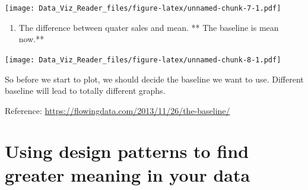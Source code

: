 \documentclass[]{book}
\newenvironment{Shaded}{\begin{snugshade}}{\end{snugshade}}
\newcommand{\KeywordTok}[1]{\textcolor[rgb]{0.13,0.29,0.53}{\textbf{#1}}}
\newcommand{\DataTypeTok}[1]{\textcolor[rgb]{0.13,0.29,0.53}{#1}}
\newcommand{\DecValTok}[1]{\textcolor[rgb]{0.00,0.00,0.81}{#1}}
\newcommand{\StringTok}[1]{\textcolor[rgb]{0.31,0.60,0.02}{#1}}
\newcommand{\CommentTok}[1]{\textcolor[rgb]{0.56,0.35,0.01}{\textit{#1}}}
\newcommand{\OtherTok}[1]{\textcolor[rgb]{0.56,0.35,0.01}{#1}}
\newcommand{\ControlFlowTok}[1]{\textcolor[rgb]{0.13,0.29,0.53}{\textbf{#1}}}
\newcommand{\OperatorTok}[1]{\textcolor[rgb]{0.81,0.36,0.00}{\textbf{#1}}}
\newcommand{\NormalTok}[1]{#1}
\providecommand{\tightlist}{%
  \setlength{\itemsep}{0pt}\setlength{\parskip}{0pt}}
\theoremstyle{definition}
\theoremstyle{definition}
\theoremstyle{definition}
\theoremstyle{remark}
\begin{document}
\texttt{[image: Data\_Viz\_Reader\_files/figure-latex/unnamed-chunk-7-1.pdf]}

\begin{enumerate}
\def\labelenumi{\arabic{enumi}.}
\setcounter{enumi}{4}
\tightlist
\item
  The difference between quater sales and mean. ** The baseline is mean
  now.**
\end{enumerate}

\begin{Shaded}
\end{Shaded}

\texttt{[image: Data\_Viz\_Reader\_files/figure-latex/unnamed-chunk-8-1.pdf]}

So before we start to plot, we should decide the baseline we want to
use. Different baseline will lead to totally different graphs.

Reference: \url{https://flowingdata.com/2013/11/26/the-baseline/}

\section{Using design patterns to find greater meaning in your
data}\label{using-design-patterns-to-find-greater-meaning-in-your-data}
\end{document}
